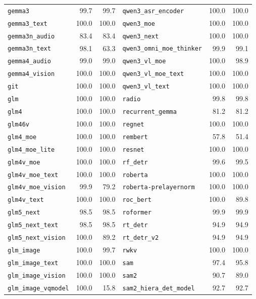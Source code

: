 \begin{longtable}{@{}lrr@{\hspace{24pt}}lrr@{}}
\texttt{gemma3} & 99.7 & 99.7 & \texttt{qwen3\_asr\_encoder} & 100.0 & 100.0 \\
\texttt{gemma3\_text} & 100.0 & 100.0 & \texttt{qwen3\_moe} & 100.0 & 100.0 \\
\texttt{gemma3n\_audio} & 83.4 & 83.4 & \texttt{qwen3\_next} & 100.0 & 100.0 \\
\texttt{gemma3n\_text} & 98.1 & 63.3 & \texttt{qwen3\_omni\_moe\_thinker} & 99.9 & 99.1 \\
\texttt{gemma4\_audio} & 99.0 & 99.0 & \texttt{qwen3\_vl\_moe} & 100.0 & 98.9 \\
\texttt{gemma4\_vision} & 100.0 & 100.0 & \texttt{qwen3\_vl\_moe\_text} & 100.0 & 100.0 \\
\texttt{git} & 100.0 & 100.0 & \texttt{qwen3\_vl\_text} & 100.0 & 100.0 \\
\texttt{glm} & 100.0 & 100.0 & \texttt{radio} & 99.8 & 99.8 \\
\texttt{glm4} & 100.0 & 100.0 & \texttt{recurrent\_gemma} & 81.2 & 81.2 \\
\texttt{glm46v} & 100.0 & 100.0 & \texttt{regnet} & 100.0 & 100.0 \\
\texttt{glm4\_moe} & 100.0 & 100.0 & \texttt{rembert} & 57.8 & 51.4 \\
\texttt{glm4\_moe\_lite} & 100.0 & 100.0 & \texttt{resnet} & 100.0 & 100.0 \\
\texttt{glm4v\_moe} & 100.0 & 100.0 & \texttt{rf\_detr} & 99.6 & 99.5 \\
\texttt{glm4v\_moe\_text} & 100.0 & 100.0 & \texttt{roberta} & 100.0 & 100.0 \\
\texttt{glm4v\_moe\_vision} & 99.9 & 79.2 & \texttt{roberta-prelayernorm} & 100.0 & 100.0 \\
\texttt{glm4v\_text} & 100.0 & 100.0 & \texttt{roc\_bert} & 100.0 & 89.8 \\
\texttt{glm5\_next} & 98.5 & 98.5 & \texttt{roformer} & 99.9 & 99.9 \\
\texttt{glm5\_next\_text} & 98.5 & 98.5 & \texttt{rt\_detr} & 94.9 & 94.9 \\
\texttt{glm5\_next\_vision} & 100.0 & 89.2 & \texttt{rt\_detr\_v2} & 94.9 & 94.9 \\
\texttt{glm\_image} & 100.0 & 99.7 & \texttt{rwkv} & 100.0 & 100.0 \\
\texttt{glm\_image\_text} & 100.0 & 100.0 & \texttt{sam} & 97.4 & 95.8 \\
\texttt{glm\_image\_vision} & 100.0 & 100.0 & \texttt{sam2} & 90.7 & 89.0 \\
\texttt{glm\_image\_vqmodel} & 100.0 & 15.8 & \texttt{sam2\_hiera\_det\_model} & 92.7 & 92.7 \\

\end{longtable}
